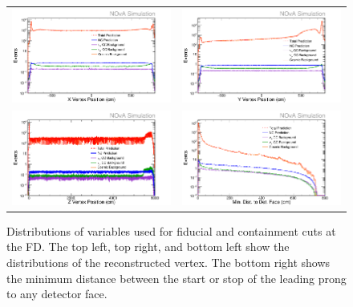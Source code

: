 \begin{figure}[htb]
  \centering
  \begin{tabular}{c c}
    \includegraphics[width=.47\textwidth]{figures/SelNP1/NP1VtxX.png} &
    \includegraphics[width=.47\textwidth]{figures/SelNP1/NP1VtxY.png} \\
    \includegraphics[width=.47\textwidth]{figures/SelNP1/NP1VtxZ.png} &
    \includegraphics[width=.47\textwidth]{figures/SelNP1/NP1Cont.png} \\
  \end{tabular}
  \caption[Fiducial and Containment Variable Distributions]{Distributions of variables used for fiducial and containment cuts at the FD. The top left, top right, and bottom left show the distributions of the reconstructed vertex. The bottom right shows the minimum distance between the start or stop of the leading prong to any detector face.}
  \label{fig:FidCont}
\end{figure}

